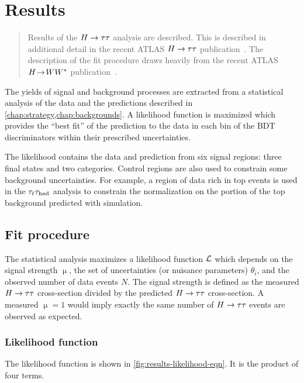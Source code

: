 \chapter[Results][Results]{Results}
\label{chap:results}

\begin{quote}
  Results of the $H\rightarrow\tau\tau$ analysis are described. This is described in additional detail in the recent ATLAS $H\rightarrow\tau\tau$ publication~\cite{HIGG-2013-32}. The description of the fit procedure draws heavily from the recent ATLAS $H \!\rightarrow\! WW^\ast$ publication~\cite{HIGG-2013-13}.
\end{quote}

The yields of signal and background processes are extracted from a statistical analysis of the data and the predictions described in \cref{chap:strategy,chap:backgrounds}. A likelihood function is maximized which provides the ``best fit'' of the prediction to the data in each bin of the BDT discriminators within their prescribed uncertainties.

The likelihood contains the data and prediction from six signal regions: three final states and two categories. Control regions are also used to constrain some background uncertainties. For example, a region of data rich in top events is used in the $\tau_\ell\tau_\text{had}$ analysis to constrain the normalization on the portion of the top background predicted with simulation.

\section{Fit procedure}
\label{sec:results-fit-procedure}

The statistical analysis maximizes a likelihood function $\mathcal{L}$ which depends on the signal strength $\upmu$, the set of uncertainties (or nuisance parameters) $\theta_i$, and the observed number of data events $N$. The signal strength is defined as the measured $H\rightarrow\tau\tau$ cross-section divided by the predicted $H\rightarrow\tau\tau$ cross-section. A measured $\upmu=1$ would imply exactly the same number of $H\rightarrow\tau\tau$ events are observed as expected.

\subsection{Likelihood function}

The likelihood function is shown in \cref{fig:results-likelihood-eqn}. It is the product of four terms.
%

